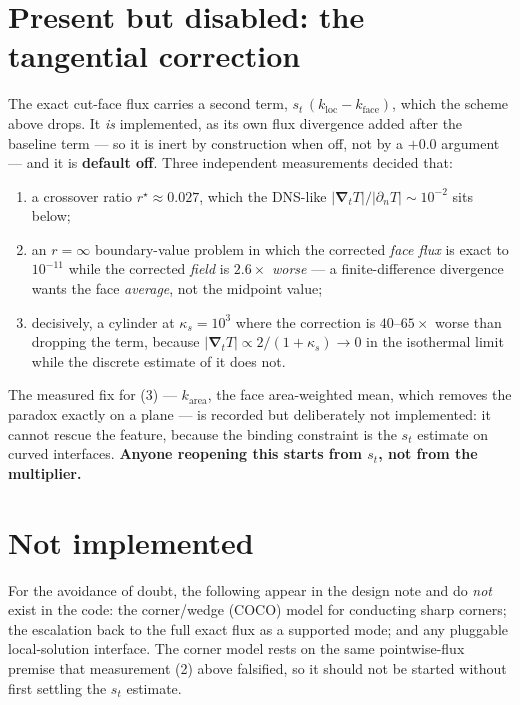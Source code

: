 \documentclass[11pt,a4paper]{article}
\newcommand{\grad}{\boldsymbol{\nabla}}
\begin{document}
\section{Present but disabled: the tangential correction}
\label{sec:disabled}

The exact cut-face flux carries a second term, $s_t\,(k_{\text{loc}} -
k_{\text{face}})$, which the scheme above drops. It \emph{is} implemented, as
its own flux divergence added after the baseline term --- so it is inert by
construction when off, not by a $+0.0$ argument --- and it is
\textbf{default off}. Three independent measurements decided that:

\begin{enumerate}
\item a crossover ratio $r^\star \approx 0.027$, which the DNS-like
      $|\grad_t T|/|\partial_n T| \sim 10^{-2}$ sits below;
\item an $r=\infty$ boundary-value problem in which the corrected \emph{face
      flux} is exact to $10^{-11}$ while the corrected \emph{field} is
      $2.6\times$ \emph{worse} --- a finite-difference divergence wants the
      face \emph{average}, not the midpoint value;
\item decisively, a cylinder at $\kappa_s=10^3$ where the correction is
      $40$--$65\times$ worse than dropping the term, because
      $|\grad_t T| \propto 2/(1+\kappa_s) \to 0$ in the isothermal limit while
      the discrete estimate of it does not.
\end{enumerate}

The measured fix for (3) --- $k_{\text{area}}$, the face area-weighted mean,
which removes the paradox exactly on a plane --- is recorded but deliberately
not implemented: it cannot rescue the feature, because the binding constraint
is the $s_t$ estimate on curved interfaces. \textbf{Anyone reopening this
starts from $s_t$, not from the multiplier.}

\section{Not implemented}
\label{sec:notbuilt}

For the avoidance of doubt, the following appear in the design note and do
\emph{not} exist in the code: the corner/wedge (COCO) model for conducting
sharp corners; the escalation back to the full exact flux as a supported mode;
and any pluggable local-solution interface. The corner model rests on the same
pointwise-flux premise that measurement (2) above falsified, so it should not
be started without first settling the $s_t$ estimate.
\end{document}
